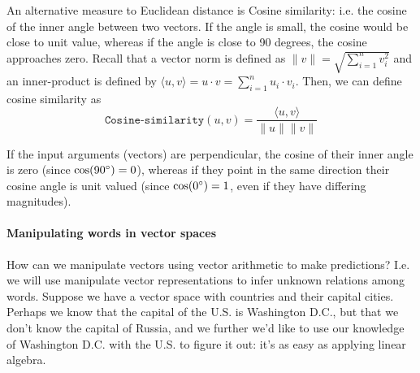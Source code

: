 \documentclass[12pt]{article}
\begin{document}
An alternative measure to Euclidean distance is Cosine similarity: i.e. the cosine of the inner angle between two vectors. If the angle is small, the cosine would be close to unit value, whereas if the angle is close to 90 degrees, the cosine approaches zero. Recall that a vector norm is defined as $\|v\| = \sqrt{\sum_{i=1}^n v_i^2}$ and an inner-product is defined by $\langle u, v \rangle = u \cdot v = \sum_{i=1}^n u_i \cdot v_i$. Then, we can define cosine similarity as
\[
  \texttt{Cosine-similarity}(u,v) = \frac{\langle u, v \rangle}{\|u\| \|v\|}
\]

If the input arguments (vectors) are perpendicular, the cosine of their inner angle is zero (since $\cos(90\degree) = 0$), whereas if they point in the same direction their cosine angle is unit valued (since $\cos(0\degree) = 1$, even if they have differing magnitudes).

\paragraph{Manipulating words in vector spaces} How can we manipulate vectors using vector arithmetic to make predictions? I.e. we will use manipulate vector representations to infer unknown relations among words. Suppose we have a vector space with countries and their capital cities. Perhaps we know that the capital of the U.S. is Washington D.C., but that we don't know the capital of Russia, and we further we'd like to use our knowledge of Washington D.C. with the U.S. to figure it out: it's as easy as applying linear algebra.
\end{document}
